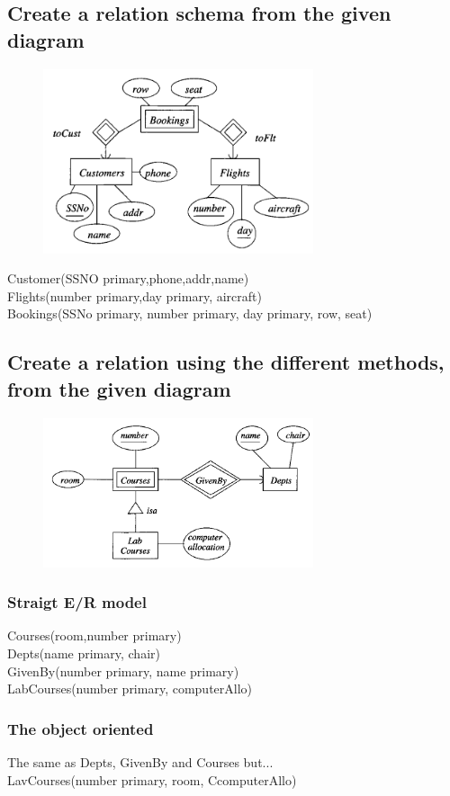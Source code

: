 \documentclass[12pt, a4paper]{article}
\begin{document}
			\subsection{Create a relation schema from the given diagram}
				\begin{figure}[h!]
						  \centering
						  \includegraphics[width=300px]{assets/W12E4.png}
				\end{figure}
		 		Customer(SSNO primary,phone,addr,name)\\
				Flights(number primary,day primary, aircraft)\\
				Bookings(SSNo primary, number primary, day primary, row, seat)
			\subsection{Create a relation using the different methods, from the given diagram}
				\begin{figure}[h!]
						  \centering
						  \includegraphics[width=300px]{assets/W12E5.png}
				\end{figure}
		 		\subsubsection{Straigt E/R model}
					Courses(room,number primary)\\
					Depts(name primary, chair)\\
					GivenBy(number primary, name primary)\\
					LabCourses(number primary, computerAllo)
				\subsubsection{The object oriented}
					The same as Depts, GivenBy and Courses but...\\
					LavCourses(number primary, room, CcomputerAllo)
\end{document}
